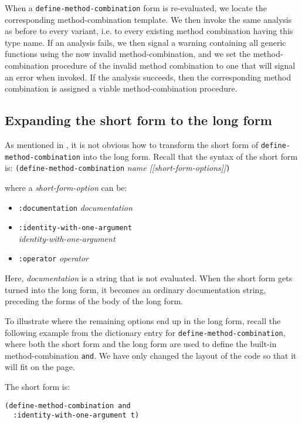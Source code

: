 When a \texttt{define-method-combination} form is re-evaluated, we
locate the corresponding method-combination template.  We then invoke
the same analysis as before to every variant, i.e. to every existing
method combination having this type name.  If an analysis fails, we
then signal a warning containing all generic functions using the now
invalid method-combination, and we set the method-combination
procedure of the invalid method combination to one that will signal an
error when invoked.  If the analysis succeeds, then the corresponding
method combination is assigned a viable method-combination procedure.

\subsection{Expanding the short form to the long form}

As mentioned in , it is not obvious how to
transform the short form of \texttt{define-method-combination} into
the long form.  Recall that the syntax of the short form is:
\vskip 0.1cm
\noindent
\texttt{(define-method-combination} \textit{name [[short-form-options]]}\texttt{)}

where a \textit{short-form-option} can be:

\begin{itemize}
\item \texttt{:documentation} \textit{documentation}
\item \texttt{:identity-with-one-argument}\\ \textit{identity-with-one-argument}
\item \texttt{:operator} \textit{operator}
\end{itemize}

Here, \textit{documentation} is a string that is not evaluated.  When
the short form gets turned into the long form, it becomes an ordinary
documentation string, preceding the forms of the body of the long
form.

To illustrate where the remaining options end up in the long form,
recall the following example from the dictionary entry for
\texttt{define-method-combination}, where both the short form and the
long form are used to define the built-in method-combination
\texttt{and}.  We have only changed the layout of the code so that it
will fit on the page.

\noindent
The short form is:

{\small\begin{verbatim}
(define-method-combination and
  :identity-with-one-argument t)
\end{verbatim}}

